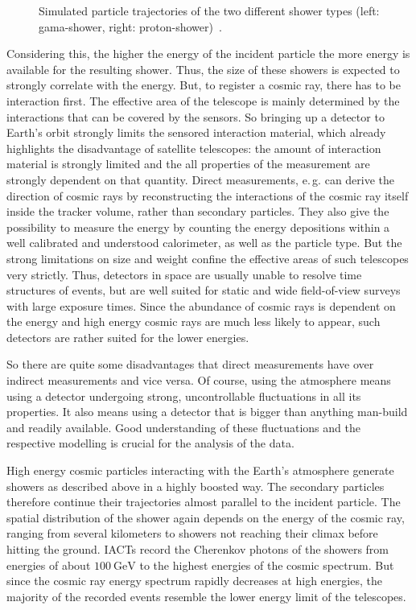 \begin{figure}
\begin{subfigure}{0.475\textwidth}
    \label{fig:gamma}
  \end{subfigure}
  \caption{Simulated particle trajectories of the two different shower types (left: gama-shower, right: proton-shower)~\cite{shower}.}
  \label{fig:shower}
\end{figure}

Considering this, the higher the energy of the incident particle the more
energy is available for the resulting shower. Thus, the size of these showers
is expected to strongly correlate with the energy. But, to register a cosmic
ray, there has to be interaction first. The effective area of the telescope
is mainly determined by the interactions that can be covered by the sensors. So
bringing up a detector to Earth's orbit strongly limits the sensored
interaction material, which already highlights the disadvantage of satellite
telescopes: the amount of interaction material is strongly limited and the all properties of the measurement are strongly dependent on that quantity. Direct measurements, e.\,g.
can derive the direction of cosmic rays by reconstructing the interactions of
the cosmic ray itself inside the tracker volume, rather than secondary
particles. They also give the possibility to measure the energy by counting the
energy depositions within a well calibrated and understood calorimeter, as well
as the particle type. But the strong limitations on size and weight confine the
effective areas of such telescopes very strictly. Thus, detectors in space are
usually unable to resolve time structures of events, but are well suited for
static and wide field-of-view surveys with large exposure times. Since the
abundance of cosmic rays is dependent on the energy and high energy cosmic rays
are much less likely to appear, such detectors are rather suited for the lower
energies.

So there are quite some disadvantages that direct measurements have over
indirect measurements and vice versa. Of course, using the atmosphere means
using a detector undergoing strong, uncontrollable fluctuations in all its
properties. It also means using a detector that is bigger than anything
man-build and readily available. Good understanding of these fluctuations and
the respective modelling is crucial for the analysis of the data.

High energy cosmic particles interacting with the Earth's atmosphere generate
showers as described above in a highly boosted way. The secondary particles
therefore continue their trajectories almost parallel to the incident particle.
The spatial distribution of the shower again depends on the energy of the
cosmic ray, ranging from several kilometers to showers not reaching their
climax before hitting the ground. IACTs record the Cherenkov photons of the
showers from energies of about $\SI{100}{\giga\electronvolt}$ to the highest
energies of the cosmic spectrum. But since the cosmic ray energy spectrum
rapidly decreases at high energies, the majority of the recorded events
resemble the lower energy limit of the telescopes.
